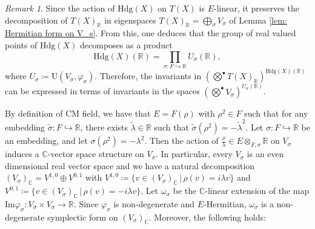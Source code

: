 \documentclass[11pt,twoside,a4paper]{amsart}
\newcommand{\0}{\mathscr{O}}
\newcommand{\R}{\mathbb{R}}
\newcommand{\C}{\mathbb{C}}
\newcommand{\s}{\sigma}
\theoremstyle{plain}
\theoremstyle{definition}
\theoremstyle{remark}
\newtheorem{rmk}[thm]{Remark}
\begin{document}
\begin{rmk}
Since the action of $\mathrm{Hdg}(X)$ on $T(X)$ is $E$-linear, it preserves the 
decomposition of $T(X)_\R$ in eigenspaces $T(X)_\R=\bigoplus_\s V_\s$ of Lemma \ref{lem: Hermitian form on V_s}. From this, one deduces that the group of real valued points of $\mathrm{Hdg}(X)$ decomposes as a product 
\[\mathrm{Hdg}(X)(\R)=\prod_{\s\colon F\hookrightarrow\R} U_\s(\R),\]
where $U_\s\coloneqq \mathrm{U}(V_\s,\varphi_\s)$.
Therefore, the invariants in $(\bigotimes^{\bullet}T(X)_\R)^{\mathrm{Hdg}(X)(\R)}$ can be expressed in terms of invariants in the spaces $(\bigotimes^{\bullet}V_\s)^{U_\s(\R)}$. \end{rmk}
By definition of CM field, we have that $E=F(\rho)$ with $\rho^2\in F$ such that for any embedding $\tilde{\s}\colon F\hookrightarrow \R$, there exists $\tilde{\lambda}\in \R$ such that $\tilde{\s}(\rho^2)=-\tilde{\lambda}^2$.
Let $\s\colon F\hookrightarrow \R$ be an embedding, and let $\s(\rho^2)=-\lambda^2$. Then the action of $\frac{\rho}{\lambda}\in E\otimes_{F,\s}\R$ on $V_\s$ induces a $\C$-vector space structure on $V_\s$. In particular, every $V_\s$  is an even dimensional real vector space and we have a natural decomposition $(V_\s)_\C=V^{1,0}\oplus V^{0,1}$ with $V^{1,0}\coloneqq \{v\in (V_\s)_\C\, |\, \rho (v)=i\lambda v\}$ and $V^{0,1}\coloneqq \{v\in (V_\s)_\C\, |\, \rho (v)=-i\lambda v\}$.
Let $\omega_\s$ be the $\C$-linear extension of the map $\mathrm{Im}\varphi_\s\colon V_\s\times V_\s\rightarrow \R$. Since $\varphi_\s$ is non-degenerate and $E$-Hermitian, $\omega_\s$ is a non-degenerate symplectic form on $(V_\s)_\C$. Moreover, the following holds:
\end{document}
